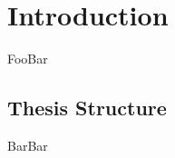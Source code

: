 
\chapter{Introduction}\label{c:introduction}
FooBar

\section{Thesis Structure}\label{s:structure}
BarBar

